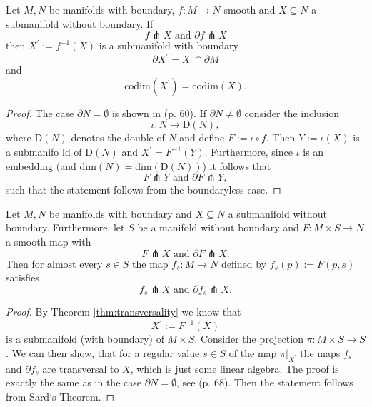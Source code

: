     \begin{theorem}
    \label{thm:transversality}
    Let $M,N$ be manifolds with boundary, $f \colon M \to N$ smooth and $X \subseteq N$ a submanifold without boundary. If 
    \[
    f \pitchfork X \text{ and } \partial f \pitchfork X
    \]
    then $X^\prime := f^{-1}(X)$ is a submanifold with boundary 
    \[
    \partial X^\prime = X^\prime \cap \partial M
    \]
    and 
    \[
    \mathrm{codim}(X^\prime) = \mathrm{codim}(X).
    \]
    \end{theorem}
    \begin{proof}
        The case $\partial N = \emptyset$ is shown in \cite{guillemin2010differential} (p. 60). If $\partial N \neq \emptyset$ consider the inclusion
        \[
        \iota \colon N \to \mathrm{D}(N),
        \]
        where $\mathrm{D}(N)$ denotes the double of $N$ and define $F := \iota \circ f$. Then $Y := \iota(X)$ is a submanifo  ld of $\mathrm{D}(N)$ and $X^\prime = F^{-1}(Y)$. Furthermore, since $\iota$ is an embedding (and $\mathrm{dim}(N) = \mathrm{dim}(\mathrm{D}(N))$) it follows that 
        \[
        F \pitchfork Y \text{ and } \partial F \pitchfork Y,
        \] 
        such that the statement follows from the boundaryless case.
    \end{proof}

    \begin{theorem}
        \label{thm:parametric_transversality}
        Let $M,N$ be manifolds with boundary and $X \subseteq N$ a submanifold without boundary. Furthermore, let $S$ be a manifold without boundary and $F \colon M \times S \to N$ a smooth map with 
        \[
            F \pitchfork X \text{ and } \partial F \pitchfork X.
        \]
        Then for almost every $s \in S$ the map $f_s \colon M \to N$ defined by $f_s(p) := F(p,s)$ satisfies
        \[
            f_s \pitchfork X \text{ and } \partial f_s \pitchfork X.
        \]
    \end{theorem}
    \begin{proof}
        By Theorem \ref{thm:transversality} we know that 
        \[
        X^\prime := F^{-1}(X)
        \]
        is a submanifold (with boundary) of $M \times S$. Consider the projection $\pi \colon M \times S \to S$. We can then show, that for a regular value $s \in S$ of the map $\pi|_{X^\prime}$ the maps $f_s$ and $\partial f_s$ are transversal to $X$, which is just some linear algebra. The proof is exactly the same as in the case $\partial N = \emptyset$, see \cite{guillemin2010differential} (p. 68). Then the statement follows from Sard`s Theorem.
    \end{proof}

